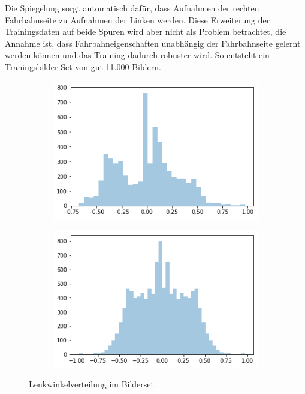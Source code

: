 Die Spiegelung sorgt automatisch dafür, dass Aufnahmen der rechten Fahrbahnseite zu Aufnahmen der Linken werden. Diese Erweiterung der Trainingsdaten auf beide Spuren wird aber nicht als Problem betrachtet, die Annahme ist, dass Fahrbahneigenschaften unabhängig der Fahrbahnseite gelernt werden können und das Training dadurch robuster wird. So entsteht ein Traningsbilder-Set von gut 11.000 Bildern.

\begin{figure}[h]
	\centering
	\begin{subfigure}{.5\textwidth}
	\centering
		  \includegraphics[width=1\linewidth]{figures/steeringAngleDistribution.png}
	 	  \caption{}
		  \label{fig:anglesa}
	\end{subfigure}%
	\begin{subfigure}{.5\textwidth}
	\centering
		  \includegraphics[width=1\linewidth]{figures/steeringAngleDistributionFlipped.png}
	 	  \caption{}
		  \label{fig:anglesb}
	\end{subfigure}%
	\caption{Lenkwinkelverteilung im Bilderset}
	\label{fig:steuerungswinkel}
\end{figure}%

